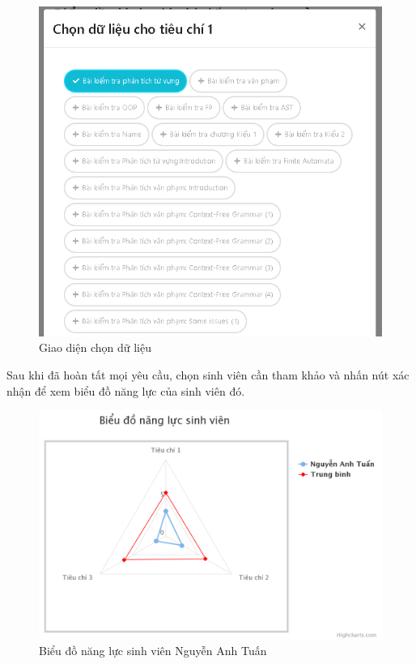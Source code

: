 \begin{center}
	\begin{figure}[htp]
		\begin{center}
			\includegraphics[width=0.5\linewidth]{img/21}
		\end{center}
		\caption{Giao diện chọn dữ liệu}
		\label{refhinh53}
	\end{figure}
\end{center}

\newpage
Sau khi đã hoàn tất mọi yêu cầu, chọn sinh viên cần tham khảo và nhấn nút xác nhận để xem biểu đồ năng lực của sinh viên đó.

\begin{center}
	\begin{figure}[htp]
		\begin{center}
			\includegraphics[width=1\linewidth]{img/22}
		\end{center}
		\caption{Biểu đồ năng lực sinh viên Nguyễn Anh Tuấn}
		\label{refhinh54}
	\end{figure}
\end{center}

